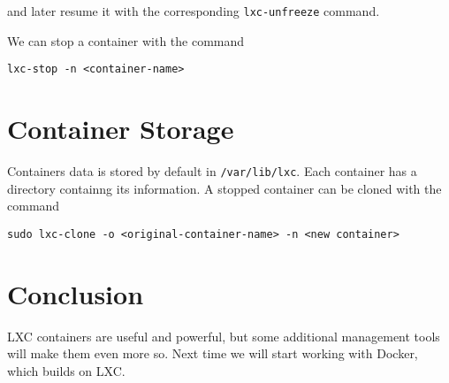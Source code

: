 \documentclass{article}
\begin{document}
and later resume it with the corresponding \texttt{lxc-unfreeze} command.

We can stop a container with the command

\begin{verbatim}
lxc-stop -n <container-name>
\end{verbatim}

\section{Container Storage}
Containers data is stored by default in \texttt{/var/lib/lxc}. Each container has a directory containng its information.  A stopped container can be cloned with the command

\begin{verbatim}
sudo lxc-clone -o <original-container-name> -n <new container>
\end{verbatim}

\section{Conclusion} 
LXC containers are useful and powerful, but some additional management tools will make them even more so. Next time we will start working with Docker, which builds on LXC.
\end{document}
